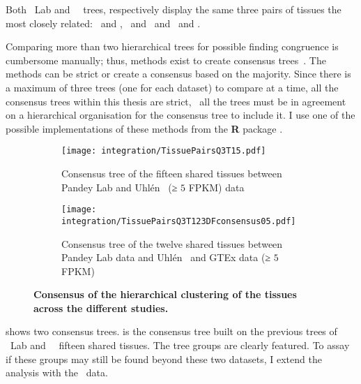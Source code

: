 Both \pandey\ Lab and \uhlen\ \etal\ trees,
respectively 
display the same three pairs of tissues the most closely related:
\Testis\ and \Ovary, \Rectum\ and \hColon\ and \Liver\ and \Kidney.

Comparing more than two hierarchical trees for possible finding congruence
is cumbersome manually;
thus, methods exist to create consensus trees~.
The methods can be strict or create a consensus based on the majority.
Since there is a maximum of three trees (one for each dataset)
to compare at a time,
all the consensus trees within this thesis are strict,
\ie\ all the trees must be in agreement on a hierarchical organisation
for the consensus tree to include it.
I use one of the possible implementations of these methods
from the \textbf{\textsf{R}} package
.

\vspace{-3mm}
\begin{figure}[!htb]
    \begin{subfigure}[b]{0.53\textwidth}
        \captionsetup{margin=0.6cm}
        \centering \texttt{[image: integration/TissuePairsQ3T15.pdf]}
        \vspace{2mm}
        \caption{Consensus tree of the fifteen shared tissues between Pandey Lab
        and Uhlén \etal\ (≥ $5$ FPKM) data}\label{fig:consensus2D15TQ3}
    \end{subfigure}%
    \begin{subfigure}[b]{0.53\textwidth}
        \captionsetup{margin=0.6cm}
        \centering \texttt{[image: integration/TissuePairsQ3T123DFconsensus05.pdf]}
        \vspace{-2mm}
        \caption{Consensus tree of the twelve shared tissues
        between Pandey Lab data and
        Uhlén \etal\ and GTEx data (≥ $5$ FPKM)}\label{fig:consensusTree05}
    \end{subfigure}
    \vspace{-6mm}
    \caption[Tissues hierachical clustering for Pandey Lab and Uhlén \etal\ data]{\label{fig:consensusTrees}%
    \textbf{Consensus of the hierarchical clustering of the tissues across the different studies.}
    }
\end{figure}

 shows two consensus trees.
 is the consensus tree built on
the previous trees of \pandey\ Lab and \uhlen\ \etal\ fifteen shared tissues.
The tree groups are clearly featured.
To assay if these groups may still be found beyond these two datasets,
I extend the analysis with the \gtex\ data.

